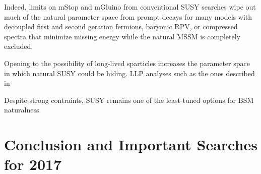 \documentclass[12pt]{article}
\begin{document}
    Indeed, limits on mStop and mGluino from conventional SUSY searches wipe out much of the natural parameter space from prompt decays for many models with decoupled first and second geration fermions, baryonic RPV, or compressed spectra that minimize missing energy while the natural MSSM is completely excluded.  

    Opening to the possibility of long-lived sparticles increases the parameter space in which natural SUSY could be hiding. LLP analyses such as the ones described in    

    Despite strong contraints, SUSY remains one of the least-tuned options for BSM naturalness.    

\section{Conclusion and Important Searches for 2017}


\clearpage
\pagebreak
\singlespacing
{}

\end{document}
